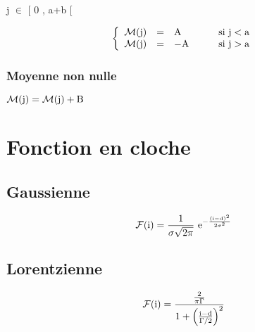\begin{minipage}[c]{.45\linewidth}
\begin{center}
j $\in$ $\big[$ 0 , a+b $\big[$
\end{center}
\[
\left\{ \begin{array}{rcll}
\mathcal{M}(\text{j}) & = & \text{A} & \qquad\text{si j}<\text{a} \\
\mathcal{M}(\text{j}) & = & -\text{A} & \qquad\text{si j}>\text{a} \end{array} \right.
\]
\end{minipage}
\hfill
\begin{minipage}[c]{.45\linewidth}
\begin{center}
 \end{center}
\end{minipage}

\subsubsection{Moyenne non nulle}
$\mathcal{M}(\text{j})=\mathcal{M}(\text{j})+\text{B}$

\section{Fonction en cloche}
\subsection{Gaussienne}
\[
\mathcal{F}\text{(i)}=\frac{1}{\sigma\sqrt{2\pi}}\text{ e}^{-\frac{(\text{i}-\text{d})^2}{2\sigma^2}}
\]
\subsection{Lorentzienne}
\[
\mathcal{F}\text{(i)}=\frac{\frac{2}{\pi\Gamma}}{1+\left(\frac{\text{i}-\text{d}}{\Gamma/2}\right)^2}
\]




